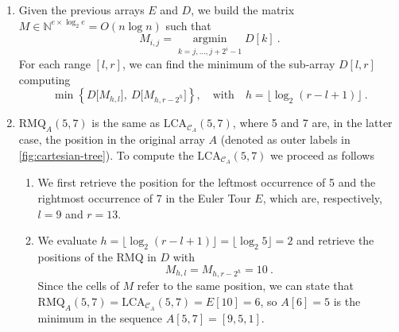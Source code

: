 \begin{enumerate}
  \item Given the previous arrays $E$ and $D$, we build the matrix $M \in
  \mathbb{N}^{e \times \log_2 e} = O(n\log n)$ such that $$M_{i, j} =
  \operatorname*{argmin}_{k = j, \dots, j + 2^i - 1} D[k]\ .$$ For each range
  $[l, r]$, we can find the minimum of the sub-array $D[l, r]$ computing $$\min
  \left\{ D\big[M_{h, l}\big],\ D\big[M_{h, r - 2^h}\big] \right\}, \quad
  \text{with}\quad h = \lfloor \log_2 (r - l + 1)\rfloor\ .$$

  \item $\text{RMQ}_A(5, 7)$ is the same as $\text{LCA}_{\mathcal{C}_A}(5, 7)$,
  where 5 and 7 are, in the latter case, the position in the original array $A$
  (denoted as outer labels in \autoref{fig:cartesian-tree}).  To compute the
  $\text{LCA}_{\mathcal{C}_A}(5, 7)$ we proceed as follows
  \begin{enumerate}

    \item We first retrieve the position for the leftmost occurrence of 5 and
    the rightmost occurrence of 7 in the Euler Tour $E$, which are,
    respectively, $l = 9$ and $r = 13$.

    \item We evaluate $h = \lfloor\log_2 (r - l + 1) \rfloor = \lfloor\log_2 5
    \rfloor = 2$ and retrieve the positions of the RMQ in $D$ with $$M_{h, l} =
    M_{h, r - 2^h} = 10\ .$$ Since the cells of $M$ refer to the same position,
    we can state that $\text{RMQ}_A(5, 7) = \text{LCA}_{\mathcal{C}_A}(5, 7) =
    E[10] = 6$, so $A[6] = 5$ is the minimum in the sequence $A[5, 7] = [9, 5,
    1]$.

  \end{enumerate}
\end{enumerate}
